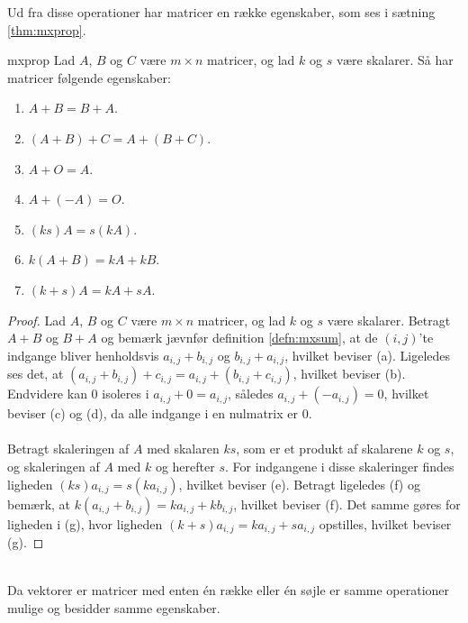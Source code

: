 %
Ud fra disse operationer har matricer en række egenskaber, som ses i sætning \ref{thm:mxprop}.
\begin{thm}{}{mxprop}
Lad $A$, $B$ og $C$ være $m \times n$ matricer, og lad $k$ og $s$ være skalarer.
Så har matricer følgende egenskaber:
\begin{enumerate}[label=(\alph*)]
\item $A + B = B + A$.
\item $(A + B) + C = A + (B + C)$.
\item $A + O = A$.
\item $A + (-A) = O$.
\item $(ks)A = s(kA)$.
\item $k(A + B) = kA + kB$.
\item $(k + s)A = kA + sA$.
\end{enumerate}
\end{thm}
%
\begin{proof}
Lad $A$, $B$ og $C$ være $m \times n$ matricer, og lad $k$ og $s$ være skalarer.
Betragt $A + B$ og $B + A$ og bemærk jævnfør definition \ref{defn:mxsum}, at de $(i,j)$'te indgange bliver henholdsvis $a_{i,j} + b_{i,j}$ og $b_{i,j} + a_{i,j}$, hvilket beviser (a).
Ligeledes ses det, at $(a_{i,j} + b_{i,j}) + c_{i,j} = a_{i,j} + (b_{i,j} + c_{i,j})$, hvilket beviser (b).
Endvidere kan $0$ isoleres i $a_{i,j} + 0 = a_{i,j}$, således $a_{i,j} + (-a_{i,j}) = 0$, hvilket beviser (c) og (d), da alle indgange i en nulmatrix er $0$.
\\\\
%
Betragt skaleringen af $A$ med skalaren $ks$, som er et produkt af skalarene $k$ og $s$, og skaleringen af $A$ med $k$ og herefter $s$.
For indgangene i disse skaleringer findes ligheden $(ks)a_{i,j} = s(ka_{i,j})$, hvilket beviser (e).
Betragt ligeledes (f) og bemærk, at $k(a_{i,j} + b_{i,j}) = ka_{i,j} + kb_{i,j}$, hvilket beviser (f).
Det samme gøres for ligheden i (g), hvor ligheden $(k + s)a_{i,j} = ka_{i,j} + sa_{i,j}$ opstilles, hvilket beviser (g).
\end{proof}
\noindent
\\
%
Da vektorer er matricer med enten én række eller én søjle er samme operationer mulige og besidder samme egenskaber.
%
